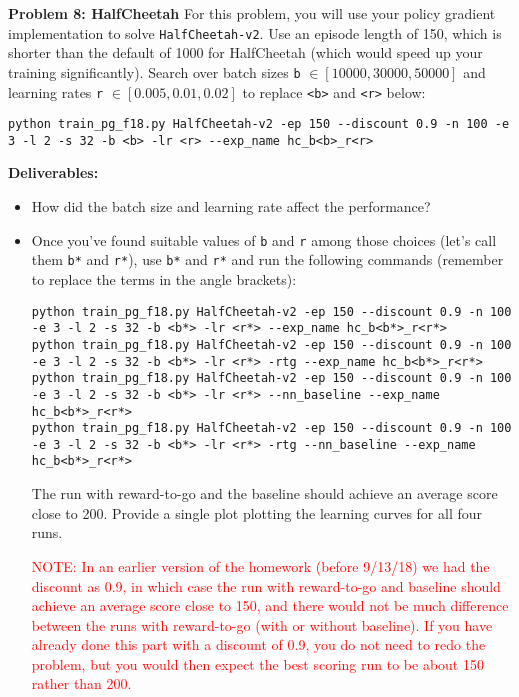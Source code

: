 \documentclass[12pt]{article}
\begin{document}
\textbf{Problem 8: HalfCheetah} For this problem, you will use your policy gradient implementation to solve \verb|HalfCheetah-v2|. 
Use an episode length of 150, which is shorter than the default of 1000 for HalfCheetah (which would speed up your training significantly).
Search over batch sizes \texttt{b} $\in [10000,30000,50000]$ and learning rates \texttt{r} $\in [0.005, 0.01, 0.02]$ to replace \texttt{<b>} and \texttt{<r>} below:
\begin{lstlisting}
python train_pg_f18.py HalfCheetah-v2 -ep 150 --discount 0.9 -n 100 -e 3 -l 2 -s 32 -b <b> -lr <r> --exp_name hc_b<b>_r<r>
\end{lstlisting}
\textbf{Deliverables:}
\begin{itemize}
    \item How did the batch size and learning rate affect the performance?
    \item Once you've found suitable values of \texttt{b} and \texttt{r} among those choices (let's call them \texttt{b*} and \texttt{r*}), use \texttt{b*} and \texttt{r*}
and run the following commands (remember to replace the terms in the angle brackets):
\begin{lstlisting}
python train_pg_f18.py HalfCheetah-v2 -ep 150 --discount 0.9 -n 100 -e 3 -l 2 -s 32 -b <b*> -lr <r*> --exp_name hc_b<b*>_r<r*>
python train_pg_f18.py HalfCheetah-v2 -ep 150 --discount 0.9 -n 100 -e 3 -l 2 -s 32 -b <b*> -lr <r*> -rtg --exp_name hc_b<b*>_r<r*>
python train_pg_f18.py HalfCheetah-v2 -ep 150 --discount 0.9 -n 100 -e 3 -l 2 -s 32 -b <b*> -lr <r*> --nn_baseline --exp_name hc_b<b*>_r<r*>
python train_pg_f18.py HalfCheetah-v2 -ep 150 --discount 0.9 -n 100 -e 3 -l 2 -s 32 -b <b*> -lr <r*> -rtg --nn_baseline --exp_name hc_b<b*>_r<r*>
\end{lstlisting}
The run with reward-to-go and the baseline should achieve an average score close to 200. Provide a single plot plotting the learning curves for all four runs.

\textcolor{red}{NOTE: In an earlier version of the homework (before 9/13/18) we had the discount as 0.9, in which case the run with reward-to-go and baseline should achieve an average score close to 150, and there would not be much difference between the runs with reward-to-go (with or without baseline). If you have already done this part with a discount of 0.9, you do not need to redo the problem, but you would then expect the best scoring run to be about 150 rather than 200.}
\end{itemize}
\end{document}
